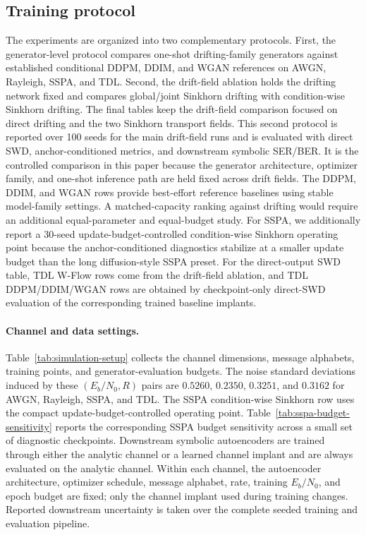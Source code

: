 \documentclass[10pt,journal]{IEEEtran}
\begin{document}
\subsection{Training protocol}
The experiments are organized into two complementary protocols.
First, the generator-level protocol compares one-shot drifting-family generators against established conditional DDPM, DDIM, and WGAN references on AWGN, Rayleigh, SSPA, and TDL.
Second, the drift-field ablation holds the drifting network fixed and compares global/joint Sinkhorn drifting with condition-wise Sinkhorn drifting.
The final tables keep the drift-field comparison focused on direct drifting and the two Sinkhorn transport fields.
This second protocol is reported over 100 seeds for the main drift-field runs and is evaluated with direct SWD, anchor-conditioned metrics, and downstream symbolic SER/BER.
It is the controlled comparison in this paper because the generator architecture, optimizer family, and one-shot inference path are held fixed across drift fields.
The DDPM, DDIM, and WGAN rows provide best-effort reference baselines using stable model-family settings.
A matched-capacity ranking against drifting would require an additional equal-parameter and equal-budget study.
For SSPA, we additionally report a 30-seed update-budget-controlled condition-wise Sinkhorn operating point because the anchor-conditioned diagnostics stabilize at a smaller update budget than the long diffusion-style SSPA preset.
For the direct-output SWD table, TDL W-Flow rows come from the drift-field ablation, and TDL DDPM/DDIM/WGAN rows are obtained by checkpoint-only direct-SWD evaluation of the corresponding trained baseline implants.



\paragraph{Channel and data settings.}
Table~\ref{tab:simulation-setup} collects the channel dimensions, message alphabets, training points, and generator-evaluation budgets.
The noise standard deviations induced by these \((E_b/N_0,R)\) pairs are \(0.5260\), \(0.2350\), \(0.3251\), and \(0.3162\) for AWGN, Rayleigh, SSPA, and TDL.
The SSPA condition-wise Sinkhorn row uses the compact update-budget-controlled operating point.
Table~\ref{tab:sspa-budget-sensitivity} reports the corresponding SSPA budget sensitivity across a small set of diagnostic checkpoints.
Downstream symbolic autoencoders are trained through either the analytic channel or a learned channel implant and are always evaluated on the analytic channel.
Within each channel, the autoencoder architecture, optimizer schedule, message alphabet, rate, training \(E_b/N_0\), and epoch budget are fixed; only the channel implant used during training changes.
Reported downstream uncertainty is taken over the complete seeded training and evaluation pipeline.
\end{document}
